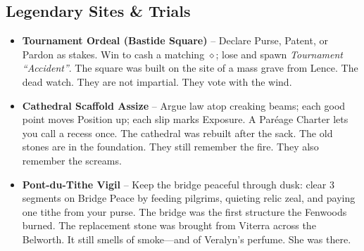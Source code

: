 \subsection*{Legendary Sites \& Trials}
\begin{itemize}
  \item \textbf{Tournament Ordeal (Bastide Square)} -- Declare Purse, Patent, or Pardon as stakes. Win to cash a matching $\diamond$; lose and spawn \emph{Tournament ``Accident''}. The square was built on the site of a mass grave from Lence. The dead watch. They are not impartial. They vote with the wind.
  \item \textbf{Cathedral Scaffold Assize} -- Argue law atop creaking beams; each good point moves Position up; each slip marks Exposure. A Paréage Charter lets you call a recess once. The cathedral was rebuilt after the sack. The old stones are in the foundation. They still remember the fire. They also remember the screams.
  \item \textbf{Pont-du-Tithe Vigil} -- Keep the bridge peaceful through dusk: clear 3 segments on Bridge Peace by feeding pilgrims, quieting relic zeal, and paying one tithe from your purse. The bridge was the first structure the Fenwoods burned. The replacement stone was brought from Viterra across the Belworth. It still smells of smoke---and of Veralyn's perfume. She was there.
\end{itemize}

